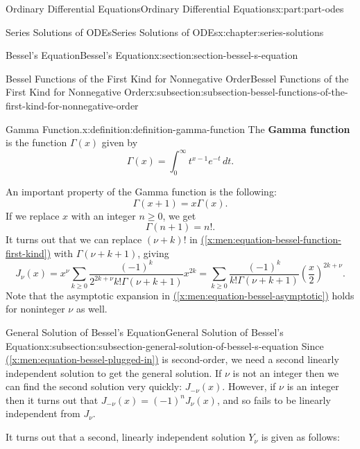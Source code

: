 \documentclass[twoside,10pt,]{book}
\newcommand{\xreffont}{\relax}
\newcommand{\terminology}[1]{\textbf{#1}}
\numberwithin{equation}{part}
\begin{document}
\begin{partptx}{Ordinary Differential Equations}{}{Ordinary Differential Equations}{}{}{x:part:part-odes}
\begin{chapterptx}{Series Solutions of ODEs}{}{Series Solutions of ODEs}{}{}{x:chapter:series-solutions}
\begin{sectionptx}{Bessel's Equation}{}{Bessel's Equation}{}{}{x:section:section-bessel-s-equation}
\begin{subsectionptx}{Bessel Functions of the First Kind for Nonnegative Order}{}{Bessel Functions of the First Kind for Nonnegative Order}{}{}{x:subsection:subsection-bessel-functions-of-the-first-kind-for-nonnegative-order}
\begin{definition}{Gamma Function.}{x:definition:definition-gamma-function}%
%
The \terminology{Gamma function} is the function \(\Gamma(x)\) given by%
\begin{equation*}
\Gamma(x) = \int_{0}^{\infty}t^{x-1}e^{-t}\,dt\text{.}
\end{equation*}
%
\end{definition}
An important property of the Gamma function is the following:%
\begin{equation*}
\Gamma(x + 1) = x\Gamma(x)\text{.}
\end{equation*}
If we replace \(x\) with an integer \(n\geq0\), we get%
\begin{equation*}
\Gamma(n + 1) = n!\text{.}
\end{equation*}
It turns out that we can replace \((\nu + k)!\) in \hyperref[x:men:equation-bessel-function-first-kind]{({\xreffont\ref{x:men:equation-bessel-function-first-kind}})} with \(\Gamma(\nu + k + 1)\), giving%
\begin{equation}
J_{\nu}(x) = x^{\nu}\sum_{k\geq0}\frac{(-1)^{k}}{2^{2k + \nu}k!\Gamma(\nu + k + 1)}x^{2k} = \sum_{k\geq0} \frac{(-1)^{k}}{k!\Gamma(\nu + k + 1)}\left(\frac{x}{2}\right)^{2k + \nu}\text{.}\label{x:men:equation-bessel-first-kind-nonnegative-order}
\end{equation}
Note that the asymptotic expansion in \hyperref[x:men:equation-bessel-asymptotic]{({\xreffont\ref{x:men:equation-bessel-asymptotic}})} holds for noninteger \(\nu\) as well.%
\end{subsectionptx}
%
%
\typeout{************************************************}
\typeout{************************************************}
%
\begin{subsectionptx}{General Solution of Bessel's Equation}{}{General Solution of Bessel's Equation}{}{}{x:subsection:subsection-general-solution-of-bessel-s-equation}
Since \hyperref[x:men:equation-bessel-plugged-in]{({\xreffont\ref{x:men:equation-bessel-plugged-in}})} is second-order, we need a second linearly independent solution to get the general solution. If \(\nu\) is not an integer then we can find the second solution very quickly: \(J_{-\nu}(x)\). However, if \(\nu\) is an integer then it turns out that \(J_{-\nu}(x) = (-1)^{n}J_{\nu}(x)\), and so fails to be linearly independent from \(J_{\nu}\).%
\par
It turns out that a second, linearly independent solution \(Y_{\nu}\) is given as follows:%

\end{subsectionptx}
\end{sectionptx}
\end{chapterptx}
\end{partptx}
\end{document}
